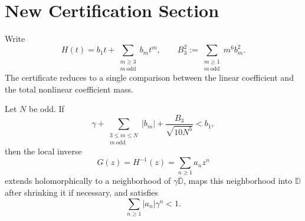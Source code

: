 \section{New Certification Section}

Write
\[
H(t)
=
b_1t
+
\sum_{\substack{m\ge 3\\ m\ \mathrm{odd}}} b_m t^m,
\qquad
B_3^2
:=
\sum_{\substack{m\ge 1\\ m\ \mathrm{odd}}} m^6 b_m^2.
\]
The certificate reduces to a single comparison between the linear
coefficient and the total nonlinear coefficient mass.

\begin{proposition}
\label{prop:head-tail-certificate}
Let \(N\) be odd. If
\begin{equation}
\gamma
+
\sum_{\substack{3\le m\le N\\m\ \mathrm{odd}}}|b_m|
+
\frac{B_3}{\sqrt{10N^5}}
<
b_1,
\label{eq:head-tail-condition}
\end{equation}
then the local inverse
\[
G(z)=H^{-1}(z)=\sum_{n\ge1}a_nz^n
\]
extends holomorphically to a neighborhood of
\(\gamma\overline{\mathbb D}\), maps this neighborhood into
\(\mathbb D\) after shrinking it if necessary, and satisfies
\[
\sum_{n\ge1}|a_n|\gamma^n<1.
\]
\end{proposition}

